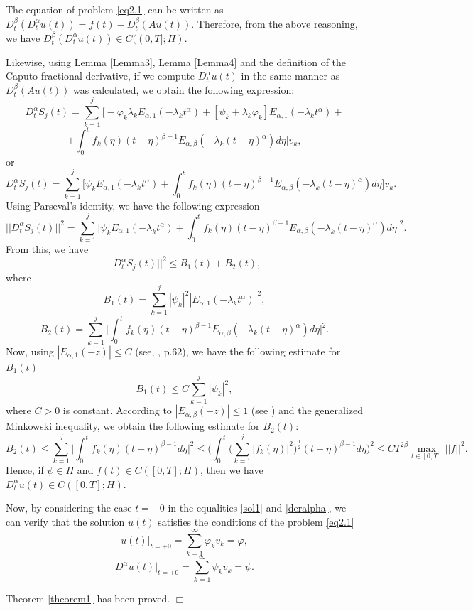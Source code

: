 \documentclass{amsart}
\numberwithin{equation}{section}
\begin{document}
The equation of problem \eqref{eq2.1} can be written as $D_t^\beta(D_t^\alpha u(t))=f(t)-D_t^\beta(Au(t))$. Therefore, from the above reasoning, we have $D_t^\beta(D_t^\alpha u(t))\in C((0,T];H)$.

Likewise, using Lemma \ref{Lemma3}, Lemma \ref{Lemma4} and the definition of the Caputo fractional derivative, if we compute $D_t^\alpha u(t)$ in the same manner as $D_t^\beta(Au(t))$ was calculated, we obtain the following expression:
$$D_t^\alpha S_j(t)=\sum_{k=1}^j \bigg[-\varphi_k \lambda_k E_{\alpha,1}(-\lambda_k t^\alpha)+[\psi_k+\lambda_k \varphi_k]E_{\alpha,1}(-\lambda_k t^\alpha)+$$
$$+\int_0^t f_k(\eta)(t-\eta)^{\beta-1} E_{\alpha,\beta}(-\lambda_k(t-\eta)^\alpha) d\eta \bigg]v_k,$$
or
\begin{equation}\label{deralpha}
D_t^\alpha S_j(t)=\sum_{k=1}^j\bigg[\psi_kE_{\alpha,1}(-\lambda_k t^\alpha)+\int_0^t f_k(\eta)(t-\eta)^{\beta-1} E_{\alpha,\beta}(-\lambda_k(t-\eta)^\alpha) d\eta  \bigg]v_k.
\end{equation}
Using Parseval's identity, we have the following expression
$$||D_t^\alpha S_j(t)||^2=\sum_{k=1}^j\bigg|\psi_kE_{\alpha,1}(-\lambda_k t^\alpha)+\int_0^t f_k(\eta)(t-\eta)^{\beta-1} E_{\alpha,\beta}(-\lambda_k(t-\eta)^\alpha) d\eta \bigg|^2.$$
From this, we have
$$||D_t^\alpha S_j(t)||^2\leq B_1(t)+B_2(t),$$
where $$B_1(t)=\sum_{k=1}^j|\psi_k|^2|E_{\alpha,1}(-\lambda_kt^\alpha)|^2,$$
$$B_2(t)=\sum_{k=1}^j\bigg|\int_0^t f_k(\eta)(t-\eta)^{\beta-1} E_{\alpha,\beta}(-\lambda_k(t-\eta)^\alpha) d\eta \bigg|^2.$$
Now, using $|E_{\alpha,1}(-z)|\leq C$ (see, \cite{Gor}, p.62), we have the following estimate for $B_1(t)$
$$B_1(t)\leq C\sum_{k=1}^j|\psi_k|^2,$$ where $C>0$ is constant.
According to $|E_{\alpha,\beta}(-z)|\leq 1$ (see \cite{Gor}) and the generalized Minkowski inequality, we obtain the following estimate for $B_2(t)$:
$$B_2(t)\leq\sum_{k=1}^j\bigg|\int_0^t f_k(\eta)(t-\eta)^{\beta-1}  d\eta \bigg|^2\leq\bigg(\int_0^t \bigg(\sum_{k=1}^j|f_k(\eta)|^2\bigg)^{\frac{1}{2}}(t-\eta)^{\beta-1}d\eta\bigg)^2\leq CT^{2\beta}\max_{t\in[0,T]}||f||^2.$$
Hence, if $\psi\in H$ and $f(t)\in C([0,T];H)$, then we have $D_t^\alpha u(t) \in C([0,T];H)$.

Now, by considering the case $t=+0$ in the equalities  \eqref{sol1} and \eqref{deralpha}, we can verify that the solution $u(t)$ satisfies the conditions of the problem \ref{eq2.1}
$$
u(t)\bigg|_{t=+0}=\sum_{k=1}^\infty \varphi_k v_k=\varphi,
$$
$$
D^\alpha u(t)\bigg|_{t=+0}=\sum_{k=1}^\infty \psi_kv_k=\psi.
$$


Theorem \ref{theorem1} has been proved.
\hfill$\Box$ \
\end{document}
